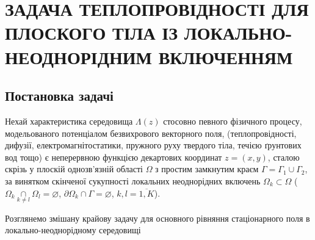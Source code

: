 \chapter{ЗАДАЧА ТЕПЛОПРОВІДНОСТІ ДЛЯ ПЛОСКОГО ТІЛА ІЗ ЛОКАЛЬНО-НЕОДНОРІДНИМ ВКЛЮЧЕННЯМ}

\nocite{bahvalov-et-al,benerdge-et-al} 

\section{Постановка задачі}

Нехай характеристика середовища $ \Lambda (z) $ стосовно певного фізичного процесу,
модельованого потенціалом безвихрового векторного поля,
(теплопровідності, дифузії, електромагнітостатики, пружного руху
твердого тіла, течією ґрунтових вод тощо) є неперервною функцією
декартових координат $ z = (x, y) $,
сталою скрізь у плоскій однозв'язній області $ \Omega $ з простим
замкнутим краєм $ \Gamma = {\Gamma_{1} \cup \Gamma_{2}} $, за
винятком скінченої сукупності локальних неоднорідних включень
$ \Omega_{k}\subset\Omega $ ( $ \Omega_k \underset {k \neq l} \cap \Omega_l = \varnothing $, 
$\partial \Omega_k \cap \Gamma = \varnothing $, $ k,l = \overline{1,K} $).

Розглянемо змішану крайову задачу для основного рівняння стаціонарного
поля в локально-неоднорідному середовищі








